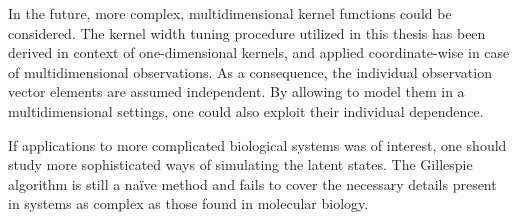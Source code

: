 In the future, more complex, multidimensional kernel functions could be considered. The kernel width tuning procedure utilized in this thesis has been derived in context of one-dimensional kernels, and applied coordinate-wise in case of multidimensional observations. As a consequence, the individual observation vector elements are assumed independent. By allowing to model them in a multidimensional settings, one could also exploit their individual dependence.

If applications to more complicated biological systems was of interest, one should study more sophisticated ways of simulating the latent states. The Gillespie algorithm is still a naïve method and fails to cover the necessary details present in systems as complex as those found in molecular biology.
